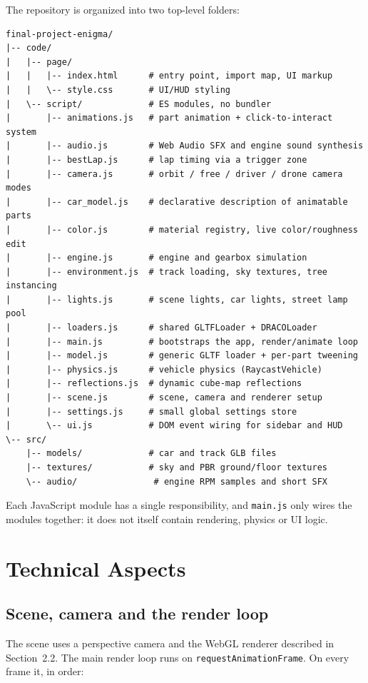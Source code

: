 \documentclass[11pt]{article}
\begin{document}
The repository is organized into two top-level folders:

\begin{verbatim}
final-project-enigma/
|-- code/
|   |-- page/
|   |   |-- index.html      # entry point, import map, UI markup
|   |   \-- style.css       # UI/HUD styling
|   \-- script/             # ES modules, no bundler
|       |-- animations.js   # part animation + click-to-interact system
|       |-- audio.js        # Web Audio SFX and engine sound synthesis
|       |-- bestLap.js      # lap timing via a trigger zone
|       |-- camera.js       # orbit / free / driver / drone camera modes
|       |-- car_model.js    # declarative description of animatable parts
|       |-- color.js        # material registry, live color/roughness edit
|       |-- engine.js       # engine and gearbox simulation
|       |-- environment.js  # track loading, sky textures, tree instancing
|       |-- lights.js       # scene lights, car lights, street lamp pool
|       |-- loaders.js      # shared GLTFLoader + DRACOLoader
|       |-- main.js         # bootstraps the app, render/animate loop
|       |-- model.js        # generic GLTF loader + per-part tweening
|       |-- physics.js      # vehicle physics (RaycastVehicle)
|       |-- reflections.js  # dynamic cube-map reflections
|       |-- scene.js        # scene, camera and renderer setup
|       |-- settings.js     # small global settings store
|       \-- ui.js           # DOM event wiring for sidebar and HUD
\-- src/
    |-- models/             # car and track GLB files
    |-- textures/           # sky and PBR ground/floor textures
    \-- audio/               # engine RPM samples and short SFX
\end{verbatim}

Each JavaScript module has a single responsibility, and \texttt{main.js}
only wires the modules together: it does not itself contain rendering,
physics or UI logic.

\section{Technical Aspects}

\subsection{Scene, camera and the render loop}
The scene uses a perspective camera and the WebGL renderer described in
Section~2.2. The main render loop runs on
\texttt{requestAnimationFrame}. On every frame it, in order:
\end{document}
